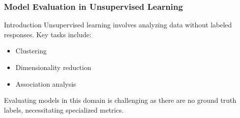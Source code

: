 \documentclass[aspectratio=169]{beamer}
\begin{document}
\begin{frame}[fragile]
    \frametitle{Model Evaluation in Unsupervised Learning}
    
    \begin{block}{Introduction}
        Unsupervised learning involves analyzing data without labeled responses. Key tasks include:
        \begin{itemize}
            \item Clustering
            \item Dimensionality reduction
            \item Association analysis
        \end{itemize}
        Evaluating models in this domain is challenging as there are no ground truth labels, necessitating specialized metrics.
    \end{block}
\end{frame}
\end{document}
